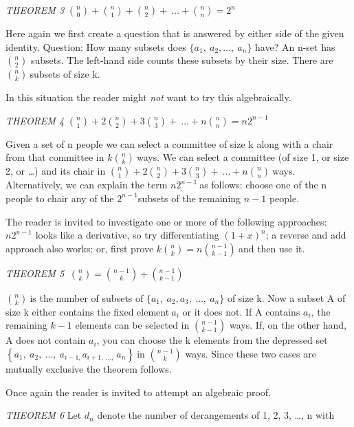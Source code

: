 \emph{THEOREM 3} \(\binom{n}{0}
 +
\binom{n}{1}
 +
\binom{n}{2}
 + \ \ldots +
\binom{n}{n}
 = 2^{n}\)

Here again we first create a question that is answered by either side of
the given identity. Question: How many subsets does
\(\{ a_{1},\ a_{2},\ldots,\ a_{n}\}\) have? An n-set has
\(\binom{n}{2}
\) subsets. The left-hand side counts these subsets by
their size. There are \(\binom{n}{k}
\ \)subsets of size k.

In this situation the reader might \emph{not} want to try this
algebraically.

\emph{THEOREM 4} \(\binom{n}{1}
 + 2
\binom{n}{2}
 + 3
\binom{n}{3}
 + \ \ldots + n
\binom{n}{n}
 = {n2}^{n - 1}\)

Given a set of n people we can select a committee of size k along with a
chair from that committee in \(k
\binom{n}{k}
\ \)ways. We can select a committee (of size 1, or size 2,
or \ldots{}) and its chair in \(\binom{n}{1}
 + 2
\binom{n}{2}
 + 3
\binom{n}{3}
 + \ \ldots + n
\binom{n}{n}
\ \)ways. Alternatively, we can explain the term
\(n2^{n - 1}\ \)as follows: choose one of the n people to chair any of
the \(2^{n - 1}\)subsets of the remaining \(n - 1\) people.

The reader is invited to investigate one or more of the following
approaches: \(n2^{n - 1}\) looks like a derivative, so try
differentiating \(\left( 1 + x \right)^{n}\); a reverse and add approach
also works; or, first prove \(k
\binom{n}{k}
 = n
\binom{n - 1}{k - 1}
\ \)and then use it.

\emph{THEOREM 5} \(\
\binom{n}{k}
 =
\binom{n - 1}{k}
 +
\binom{n - 1}{k - 1}
\)

\(\binom{n}{k}
\ \)is the number of subsets of
\(\{ a_{1},\ a_{2},a_{3},\ \ldots,\ a_{n}\}\) of size k. Now a subset A
of size k either contains the fixed element\(\ a_{i}\) or it does not.
If A contains \(a_{i}\), the remaining \(k - 1\) elements can be
selected in \(\binom{n - 1}{k - 1}
\) ways. If, on the other hand, A does not contain
\(a_{i}\), you can choose the k elements from the depressed set
\(\left\{ a_{1},\ a_{2},\ \ldots,\ a_{i - 1,}a_{i + 1,\ \ldots,\ }a_{n} \right\}\ \)in
\(\binom{n - 1}{k}
\) ways. Since these two cases are mutually exclusive the
theorem follows.

Once again the reader is invited to attempt an algebraic proof.

\emph{THEOREM 6} Let \(d_{n}\) denote the number of derangements of 1,
2, 3, \ldots{}, n with

